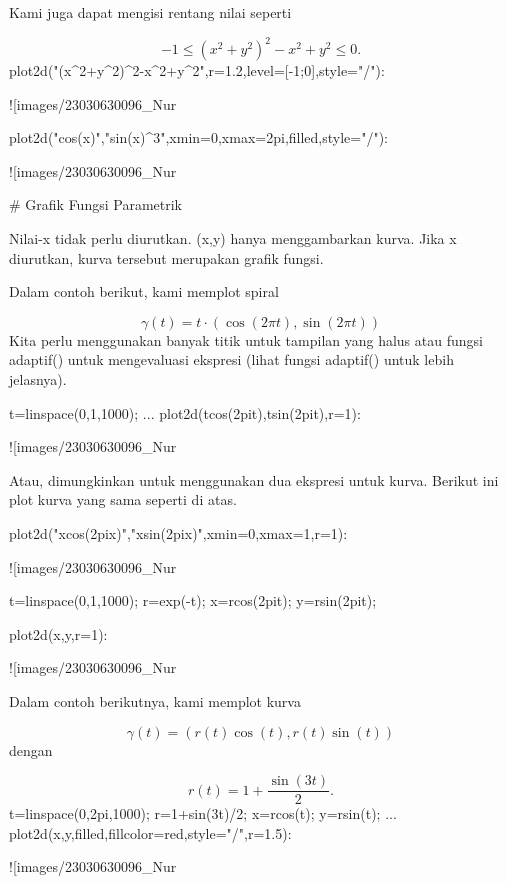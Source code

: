 \documentclass{article}
\begin{document}
Kami juga dapat mengisi rentang nilai seperti


$$-1 \le (x^2+y^2)^2-x^2+y^2 \le 0.$$\>plot2d("(x^2+y^2)^2-x^2+y^2",r=1.2,level=[-1;0],style="/"):


![images/23030630096_Nur%

\>plot2d("cos(x)","sin(x)^3",xmin=0,xmax=2pi,\>filled,style="/"):


![images/23030630096_Nur%

# Grafik Fungsi Parametrik

Nilai-x tidak perlu diurutkan. (x,y) hanya menggambarkan kurva. Jika x
diurutkan, kurva tersebut merupakan grafik fungsi.


Dalam contoh berikut, kami memplot spiral


$$\gamma(t) = t \cdot (\cos(2\pi t),\sin(2\pi t))$$Kita perlu menggunakan banyak titik untuk tampilan yang halus atau
fungsi adaptif() untuk mengevaluasi ekspresi (lihat fungsi adaptif()
untuk lebih jelasnya).


\>t=linspace(0,1,1000); ...  
\>   plot2d(t\*cos(2\*pi\*t),t\*sin(2\*pi\*t),r=1):


![images/23030630096_Nur%

Atau, dimungkinkan untuk menggunakan dua ekspresi untuk kurva. Berikut
ini plot kurva yang sama seperti di atas.


\>plot2d("x\*cos(2\*pi\*x)","x\*sin(2\*pi\*x)",xmin=0,xmax=1,r=1):


![images/23030630096_Nur%

\>t=linspace(0,1,1000); r=exp(-t); x=r\*cos(2pi\*t); y=r\*sin(2pi\*t);

\>plot2d(x,y,r=1):


![images/23030630096_Nur%

Dalam contoh berikutnya, kami memplot kurva


$$\gamma(t) = (r(t) \cos(t), r(t) \sin(t))$$dengan


$$r(t) = 1 + \dfrac{\sin(3t)}{2}.$$\>t=linspace(0,2pi,1000); r=1+sin(3\*t)/2; x=r\*cos(t); y=r\*sin(t); ...  
\>   plot2d(x,y,\>filled,fillcolor=red,style="/",r=1.5):


![images/23030630096_Nur%
\end{document}

